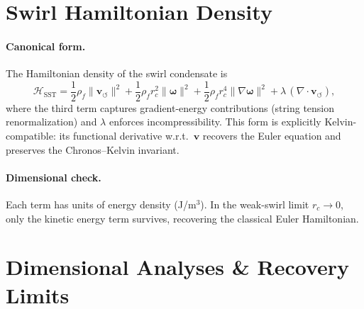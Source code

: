 \documentclass[10pt,reprint,aps,onecolumn,nofootinbib]{revtex4-2}
\begin{document}

    \section{Swirl Hamiltonian Density}
    \label{canon58:appA}
    \paragraph{Canonical form.}
        The Hamiltonian density of the swirl condensate is
        \[
            \mathcal{H}_{\mathrm{SST}} =
            \frac{1}{2} \rho_{\!f} \lVert \mathbf{v}_{\!\boldsymbol{\circlearrowleft}}\rVert^2
            + \frac{1}{2} \rho_{\!f} r_c^{2} \lVert \boldsymbol{\omega} \rVert^{2}
            + \frac{1}{2} \rho_{\!f} r_c^{4} \lVert \nabla \boldsymbol{\omega} \rVert^{2}
            + \lambda\,(\nabla \cdot \mathbf{v}_{\!\boldsymbol{\circlearrowleft}}),
        \]
        where the third term captures gradient-energy contributions (string tension renormalization)
        and $\lambda$ enforces incompressibility. This form is explicitly Kelvin-compatible:
        its functional derivative w.r.t.\ $\mathbf{v}$ recovers the Euler equation and preserves
        the Chronos–Kelvin invariant.

    \paragraph{Dimensional check.}
        Each term has units of energy density (J/m$^3$). In the weak-swirl limit $r_c \to 0$,
        only the kinetic energy term survives, recovering the classical Euler Hamiltonian.

    \section{Dimensional Analyses \& Recovery Limits}
    \label{canon58:appB}
\end{document}
